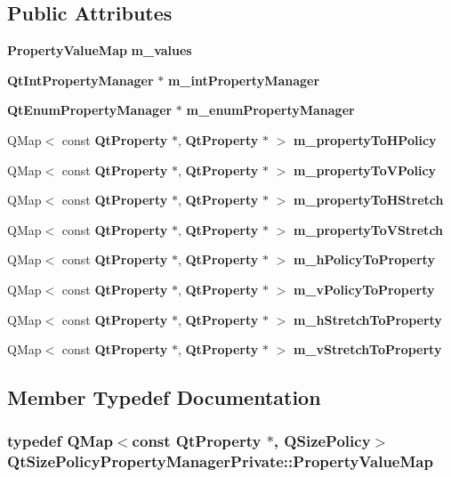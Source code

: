 \subsection*{Public Attributes}
\begin{DoxyCompactItemize}
\item 
{\bf Property\+Value\+Map} {\bf m\+\_\+values}
\item 
{\bf Qt\+Int\+Property\+Manager} $\ast$ {\bf m\+\_\+int\+Property\+Manager}
\item 
{\bf Qt\+Enum\+Property\+Manager} $\ast$ {\bf m\+\_\+enum\+Property\+Manager}
\item 
Q\+Map$<$ const {\bf Qt\+Property} $\ast$, {\bf Qt\+Property} $\ast$ $>$ {\bf m\+\_\+property\+To\+H\+Policy}
\item 
Q\+Map$<$ const {\bf Qt\+Property} $\ast$, {\bf Qt\+Property} $\ast$ $>$ {\bf m\+\_\+property\+To\+V\+Policy}
\item 
Q\+Map$<$ const {\bf Qt\+Property} $\ast$, {\bf Qt\+Property} $\ast$ $>$ {\bf m\+\_\+property\+To\+H\+Stretch}
\item 
Q\+Map$<$ const {\bf Qt\+Property} $\ast$, {\bf Qt\+Property} $\ast$ $>$ {\bf m\+\_\+property\+To\+V\+Stretch}
\item 
Q\+Map$<$ const {\bf Qt\+Property} $\ast$, {\bf Qt\+Property} $\ast$ $>$ {\bf m\+\_\+h\+Policy\+To\+Property}
\item 
Q\+Map$<$ const {\bf Qt\+Property} $\ast$, {\bf Qt\+Property} $\ast$ $>$ {\bf m\+\_\+v\+Policy\+To\+Property}
\item 
Q\+Map$<$ const {\bf Qt\+Property} $\ast$, {\bf Qt\+Property} $\ast$ $>$ {\bf m\+\_\+h\+Stretch\+To\+Property}
\item 
Q\+Map$<$ const {\bf Qt\+Property} $\ast$, {\bf Qt\+Property} $\ast$ $>$ {\bf m\+\_\+v\+Stretch\+To\+Property}
\end{DoxyCompactItemize}


\subsection{Member Typedef Documentation}
\subsubsection[{Property\+Value\+Map}]{\setlength{\rightskip}{0pt plus 5cm}typedef Q\+Map$<$const {\bf Qt\+Property} $\ast$, Q\+Size\+Policy$>$ {\bf Qt\+Size\+Policy\+Property\+Manager\+Private\+::\+Property\+Value\+Map}}\label{classQtSizePolicyPropertyManagerPrivate_acc2b0d13d042ad15b228b612821fb154}


